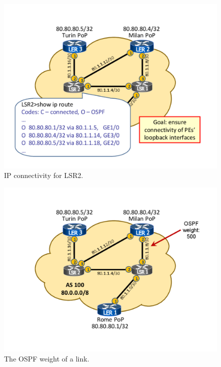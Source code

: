 \documentclass{article}
\begin{document}
\begin{figure}
\centering
 \includegraphics[trim=0cm 1.5cm 0cm 1.5cm, clip=true, width=0.7\columnwidth]{figures/mpls-slides-9}
 \caption{IP connectivity for LSR2.}
 \label{fig:mpls-slides-9}
\end{figure}

\begin{figure}
\centering
 \includegraphics[trim=0cm 1.5cm 0cm 1.5cm, clip=true, width=0.7\columnwidth]{figures/mpls-slides-10}
 \caption{The OSPF weight of a link.}
 \label{fig:mpls-slides-10}
\end{figure}
\end{document}
